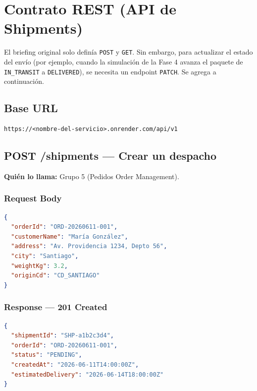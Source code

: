 \documentclass[11pt, a4paper]{article}
\begin{document}
\section{Contrato REST (API de Shipments)}
\label{sec:api}

\begin{alertbox}[title={\faExclamationTriangle\quad Corrección: Endpoint PATCH faltante}]
  El briefing original solo definía \texttt{POST} y \texttt{GET}. Sin embargo,
  para actualizar el estado del envío (por ejemplo, cuando la simulación
  de la Fase 4 avanza el paquete de \texttt{IN\_TRANSIT} a \texttt{DELIVERED}),
  se necesita un endpoint \texttt{PATCH}. Se agrega a continuación.
\end{alertbox}

\subsection{Base URL}
\begin{lstlisting}[language=http]
https://<nombre-del-servicio>.onrender.com/api/v1
\end{lstlisting}

\subsection{POST /shipments --- Crear un despacho}

\textbf{Quién lo llama:} Grupo 5 (Pedidos Order Management).

\subsubsection*{Request Body}
\begin{lstlisting}[language=json]
{
  "orderId": "ORD-20260611-001",
  "customerName": "María González",
  "address": "Av. Providencia 1234, Depto 56",
  "city": "Santiago",
  "weightKg": 3.2,
  "originCd": "CD_SANTIAGO"
}
\end{lstlisting}

\subsubsection*{Response --- 201 Created}
\begin{lstlisting}[language=json]
{
  "shipmentId": "SHP-a1b2c3d4",
  "orderId": "ORD-20260611-001",
  "status": "PENDING",
  "createdAt": "2026-06-11T14:00:00Z",
  "estimatedDelivery": "2026-06-14T18:00:00Z"
}
\end{lstlisting}
\end{document}
